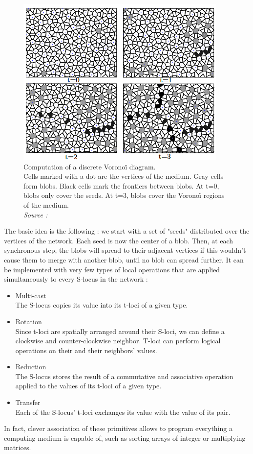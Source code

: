 \documentclass{article}
\begin{document}
\begin{figure}[H]
	\centering\includegraphics[width=0.7\linewidth]{assets/voronoi_spread.png}
	\caption{
		Computation of a discrete Voronoï diagram.\\
		Cells marked with a dot are the vertices of the medium.
		Gray cells form blobs. Black cells mark the frontiers between blobs. At t=0, blobs only cover the seeds. At t=3, blobs cover the Voronoï regions of the medium.\\
		\textit{Source : \cite{Voronoi}}
	}
	\label{fig:voronoi_spread}
\end{figure}

The basic idea is the following : we start with a set of "seeds" distributed over the vertices of the network. Each seed is now the center of a blob. Then, at each synchronous step, the blobs will spread to their adjacent vertices if this wouldn't cause them to merge with another blob, until no blob can spread further. It can be implemented with very few types of local operations that are applied simultaneously to every S-locus in the network :
\begin{itemize}
	\item Multi-cast\\
	The S-locus copies its value into its t-loci of a given type.
	\item Rotation\\
	Since t-loci are spatially arranged around their S-loci, we can define a clockwise and counter-clockwise neighbor. T-loci can perform logical operations on their and their neighbors' values.
	\item Reduction\\
	The S-locus stores the result of a commutative and associative operation applied to the values of its t-loci of a given type.
	\item Transfer\\
	Each of the S-locus' t-loci exchanges its value with the value of its pair. 
\end{itemize}
In fact, clever association of these primitives allows to program everything a computing medium is capable of, such as sorting arrays of integer or multiplying matrices\supercite{blob_computing2}.
\end{document}
